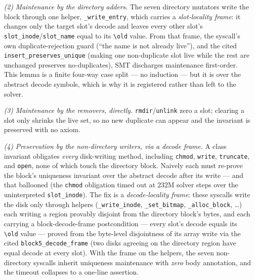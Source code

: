 \documentclass[11pt]{article}
\begin{document}
\emph{(2) Maintenance by the directory adders.} The seven directory mutators
write the block through one helper, \texttt{\_write\_entry}, which carries a
\emph{slot-locality frame}: it changes only the target slot's decode and leaves
every other slot's \texttt{slot\_inode}/\texttt{slot\_name} equal to its
\texttt{\textbackslash old} value. From that frame, the syscall's own
duplicate-rejection guard (``the name is not already live''), and the cited
\texttt{insert\_preserves\_unique} (making one non-duplicate slot live while the
rest are unchanged preserves no-duplicates), SMT discharges maintenance
first-order. This lemma is a finite four-way case split --- no induction ---
but it is over the abstract decode symbols, which is why it is registered rather
than left to the solver.

\emph{(3) Maintenance by the removers, directly.} \texttt{rmdir}/\texttt{unlink}
zero a slot; clearing a slot only shrinks the live set, so no new duplicate can
appear and the invariant is preserved with no axiom.

\emph{(4) Preservation by the non-directory writers, via a decode frame.} A
class invariant obligates \emph{every} disk-writing method, including
\texttt{chmod}, \texttt{write}, \texttt{truncate}, and \texttt{open}, none of
which touch the directory block. Naively each must re-prove the block's
uniqueness invariant over the abstract decode after its write --- and that
ballooned (the \texttt{chmod} obligation timed out at $232$M solver steps over
the uninterpreted \texttt{slot\_inode}). The fix is a \emph{decode-locality
frame}: these syscalls write the disk only through helpers
(\texttt{\_write\_inode}, \texttt{\_set\_bitmap}, \texttt{\_alloc\_block},
\ldots) each writing a region provably disjoint from the directory block's
bytes, and each carrying a block-decode-frame postcondition --- every slot's
decode equals its \texttt{\textbackslash old} value --- proved from the
byte-level disjointness of its array write via the cited
\texttt{block5\_decode\_frame} (two disks agreeing on the directory region have
equal decode at every slot). With the frame on the helpers, the seven
non-directory syscalls inherit uniqueness maintenance with \emph{zero} body
annotation, and the timeout collapses to a one-line assertion.
\end{document}

